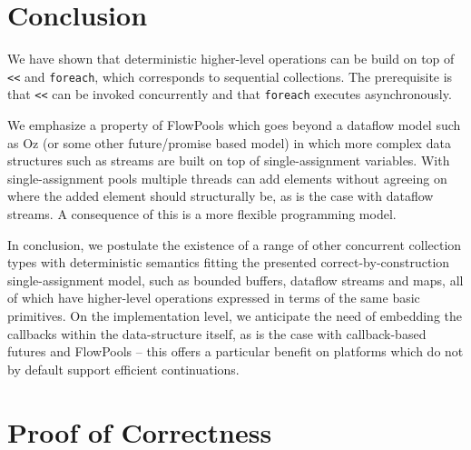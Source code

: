 \documentclass[runningheads,a4paper]{llncs}
\begin{document}
\section{Conclusion}

We have shown that deterministic higher-level operations can be build
on top of \verb=<<= and \verb=foreach=, which corresponds to
sequential collections.
The prerequisite is that \verb=<<= can be invoked concurrently and
that \verb=foreach= executes asynchronously.

We emphasize a property of FlowPools which goes beyond
a dataflow model such as Oz (or some other future/promise based
model) in which more complex data structures such as streams are built
on top of single-assignment variables.
With single-assignment pools multiple threads can add elements without
agreeing on where the added element should structurally be, as is the
case with dataflow streams.
A consequence of this is a more flexible programming model.

In conclusion, we postulate the existence of a range of other
concurrent collection types with deterministic semantics fitting the
presented correct-by-construction single-assignment model, such as
bounded buffers, dataflow streams and maps, all of which have
higher-level operations expressed in terms of the same basic
primitives.
On the implementation level, we anticipate the need of embedding the
callbacks within the data-structure itself, as is the case with
callback-based futures and FlowPools -- this offers a particular
benefit on platforms which do not by default support efficient
continuations.






\appendix
\let\oldsec\section
\renewcommand{\section}[1]{\clearpage \oldsec{#1}}
\section{Proof of Correctness}


\setcounter{lemma}{0}
\setcounter{theorem}{0}
\setcounter{corollary}{0}
\setcounter{definition}{0}
\end{document}
